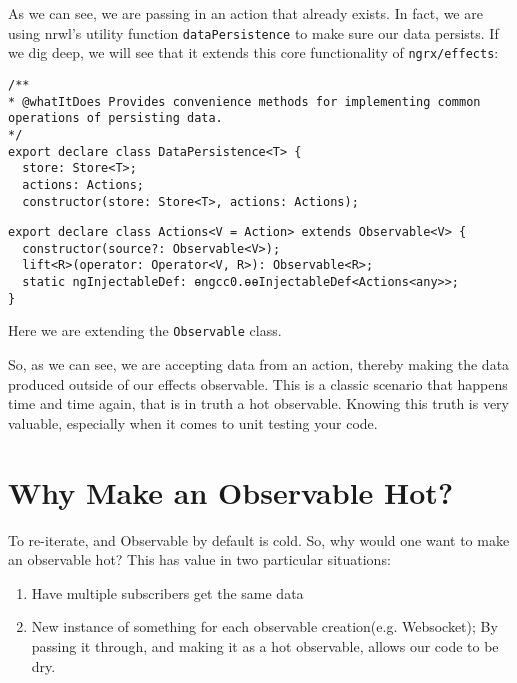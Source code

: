 As we can see, we are passing in an action that already exists. In fact, we are using nrwl's utility function \lstinline{dataPersistence} to make sure our data persists. If we dig deep, we will see that it extends this core functionality of \lstinline{ngrx/effects}: 
\begin{lstlisting}[caption=data-persistence.d.ts file from nrwl library]
/**
* @whatItDoes Provides convenience methods for implementing common operations of persisting data.
*/
export declare class DataPersistence<T> {
  store: Store<T>;
  actions: Actions;
  constructor(store: Store<T>, actions: Actions);  
\end{lstlisting}

\begin{lstlisting}[caption=actions.d.ts file from ngrx/effects library]
export declare class Actions<V = Action> extends Observable<V> {
  constructor(source?: Observable<V>);
  lift<R>(operator: Operator<V, R>): Observable<R>;
  static ngInjectableDef: ɵngcc0.ɵɵInjectableDef<Actions<any>>;
}  
\end{lstlisting}

Here we are extending the \lstinline{Observable} class. 

So, as we can see, we are accepting data from an action, thereby making the data produced outside of our effects observable. This is a classic scenario that happens time and time again, that is in truth a hot observable. Knowing this truth is very valuable, especially when it comes to unit testing your code.

\section{Why Make an Observable Hot?}
To re-iterate, and Observable by default is cold. So, why would one want to make an observable hot? This has value in two particular situations: 
\begin{enumerate}
  \item Have multiple subscribers get the same data
  \item New instance of something for each observable creation(e.g. Websocket); By passing it through, and making it as a hot observable, allows our code to be dry.
\end{enumerate}

